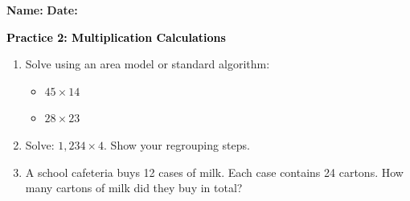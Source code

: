 \documentclass[12pt, letterpaper, fleqn]{article}
\begin{document}
\textbf{Name:} \underline{\hspace{5cm}}
\hfill
\textbf{Date:} \underline{\hspace{3cm}}\\

\begin{tcolorbox}[colback=customteal!20]
    \large\textcolor{black}{\textbf{Practice 2: Multiplication Calculations}}
\end{tcolorbox}

\vspace{5mm}
\begin{enumerate}[itemsep=3cm, leftmargin=0.6cm]
\item Solve using an area model or standard algorithm:
  \begin{itemize}[itemsep=1cm]
    \item $45 \times 14$
    \vspace{3cm}
    \item $28 \times 23$
    \vspace{3cm}
  \end{itemize}

\item Solve: $1,234 \times 4$. Show your regrouping steps.
\vspace{3cm}

\item A school cafeteria buys 12 cases of milk. Each case contains 24 cartons. How many cartons of milk did they buy in total?
\end{enumerate}
\end{document}
